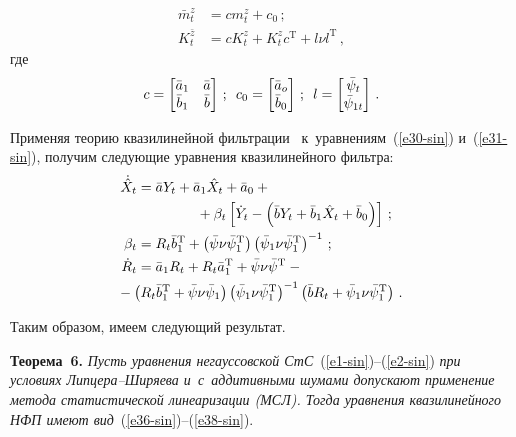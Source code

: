 \begin{multicols}{2}
  \begin{align*}
  \bar m_t^z &= cm_t^z + c_0\,; %
  \\
    K_t^{\bar z} &= c K_t^z +K_t^z c^{\mathrm{T}} + l\nu l^{\mathrm{T}}\,, %
    \end{align*}
где
    \begin{equation*}
    c=\begin{bmatrix}
    \bar a_1&\bar a\\
    \bar b_1&\bar b\end{bmatrix}\,; \enskip
    c_0=\begin{bmatrix}
    \bar a_o\\
    \bar b_0\end{bmatrix}\,;\enskip
    l=\begin{bmatrix}
    \bar \psi_t\\
    \bar\psi_{1t}\end{bmatrix}\,.\label{e35-sin}
\end{equation*}

Применяя теорию квазилинейной фильтрации~\cite{1-sin}
к~уравнениям~(\ref{e30-sin}) и~(\ref{e31-sin}), получим следующие уравнения квазилинейного фильтра:
\begin{align}
    \dot{\hat X}_t& = \bar a Y_t +\bar a_1 \hat X_t + \bar a_0 +{}\notag\\
     &\hspace*{15mm}{}+\beta_t \left[ \dot Y_t - \left( \bar b Y_t +\bar b_1 \hat{X}_t + \bar b_0\right) \right]\,;
    \label{e36-sin}
\\
   \beta_t &= R_t \bar b_1^{\mathrm{T}} +\left(\bar\psi\nu\bar\psi_1^{\mathrm{T}}\right) \left(\bar \psi_1 \nu \bar \psi_1^{\mathrm{T}}\right)^{-1}\,;\label{e37-sin}\\
    \dot R_t &= \bar a_1 R_t + R_t \bar a_1^{\mathrm{T}} +\bar\psi\nu\bar\psi^{\mathrm{T}} -{}\notag\\
&\hspace*{-5mm}{}-\left(R_t \bar b_1^{\mathrm{T}} +\bar\psi\nu\bar\psi_1\right)\left(\bar\psi_1 \nu\bar\psi_1^{\mathrm{T}}\right)^{-1} \left( \bar b R_t +\bar\psi_1\nu\bar\psi_1^{\mathrm{T}}\right)\,.
    \label{e38-sin}
    \end{align}

Таким образом, имеем следующий результат.

\smallskip

\noindent
\textbf{Теорема~6.} \textit{Пусть уравнения негауссовской СтС}~(\ref{e1-sin})--(\ref{e2-sin}) \textit{при условиях Лип\-це\-ра--Ши\-ря\-ева и~с~аддитивными шумами  допускают применение метода статистической линеаризации (МСЛ). Тогда уравнения  квазилинейного НФП имеют вид}~(\ref{e36-sin})--(\ref{e38-sin}).


\end{multicols}
